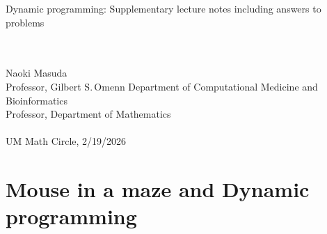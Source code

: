 \documentclass[a4paper, 12pt]{article}
\begin{document}
\begin{center}
\begin{Large}
Dynamic programming: Supplementary lecture notes including answers to problems
\end{Large}\\
\ \\
Naoki Masuda\\
Professor, Gilbert S.\,Omenn Department of Computational Medicine and Bioinformatics\\
Professor, Department of Mathematics\\
\ \\
UM Math Circle, 2/19/2026 
\end{center}


\section{Mouse in a maze and Dynamic programming}
\end{document}
